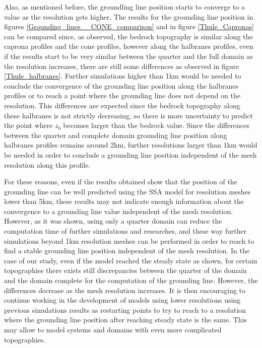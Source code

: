 \documentclass{article}
\begin{document}
Also, as mentioned before, the groundling line position starts to converge to a value as the resolution gets higher. The results for the grounding line position in figures \ref{Grounding_lines__CONE_comparison} and in figure \ref{Thule_Capronas} can be compared since, as observed, the bedrock topography is similar along the caprona profiles and the cone profiles, however along the halbranes profiles, even if the results start to be very similar between the quarter and the full domain as the resolution increases, there are still some differences as observed in figure \ref{Thule_halbranes}. Further simulations higher than 1km would be needed to conclude the convergence of the grounding line position along the halbranes profiles or to reach a point where the grounding line does not depend on the resolution. This differences are expected since the bedrock topography along these halbranes is not strictly decreasing, so there is more uncertainty to predict the point where $z_b$ becomes larger than the bedrock value. 	Since the differences between the quarter and complete domain grounding line position along halbranes profiles remains around 2km, further resolutions larger than 1km would be needed in order to conclude a grounding line position independent of the mesh resolution along this profile. 

For these reasons, even if the results obtained show that the position of the grounding line can be well predicted using the SSA model for resolution meshes lower than 5km, these results may not indicate enough information about the convergence to a grounding line value independent of the mesh resolution. However, as it was shown, using only a quarter domain can reduce the computation time of further simulations and researches, and these way further simulations beyond 1km resolution meshes can be performed in order to reach to find a stable grounding line position independent of the mesh resolution. In the case of our study, even if the model reached the steady state as shown, for certain topographies there exists still discrepancies between the quarter of the domain and the domain complete for the computation of the grounding line. However, the differences decrease as the mesh resolution increases. It is then encouraging to continue working in the development of models using lower resolutions using previous simulations results as restarting points to try to reach to a resolution where the grounding line position after reaching steady state is the same. This may allow to model systems and domains with even more complicated topographies. 
\end{document}
